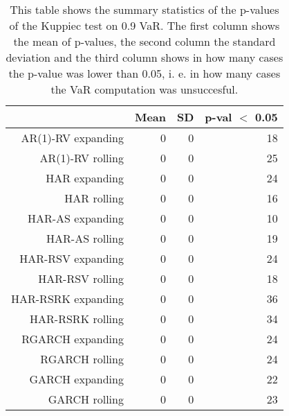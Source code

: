 \begin{table}[ht]
\centering
\begin{tabular}{rrrr}
  \hline
 & Mean & SD & p-val $<$ 0.05 \\ 
  \hline
AR(1)-RV expanding & 0 & 0 & 18 \\ 
  AR(1)-RV rolling & 0 & 0 & 25 \\ 
  HAR expanding & 0 & 0 & 24 \\ 
  HAR rolling & 0 & 0 & 16 \\ 
  HAR-AS expanding & 0 & 0 & 10 \\ 
  HAR-AS rolling & 0 & 0 & 19 \\ 
  HAR-RSV expanding & 0 & 0 & 24 \\ 
  HAR-RSV rolling & 0 & 0 & 18 \\ 
  HAR-RSRK expanding & 0 & 0 & 36 \\ 
  HAR-RSRK rolling & 0 & 0 & 34 \\ 
  RGARCH expanding & 0 & 0 & 24 \\ 
  RGARCH rolling & 0 & 0 & 24 \\ 
  GARCH expanding & 0 & 0 & 22 \\ 
  GARCH rolling & 0 & 0 & 23 \\ 
   \hline
\end{tabular}
\caption[Kupiec test p-values summary, alpha =0.9]{This table shows the summary statistics of the p-values of the Kuppiec test on 0.9 VaR. 
            The first column shows the mean of p-values, the second column the standard deviation 
            and the third column shows in how many cases the p-value was lower than 0.05, i. e. in how many cases the VaR computation was unsuccesful.} 
\label{Table:Kupiec_test_summary_0.9}
\end{table}

